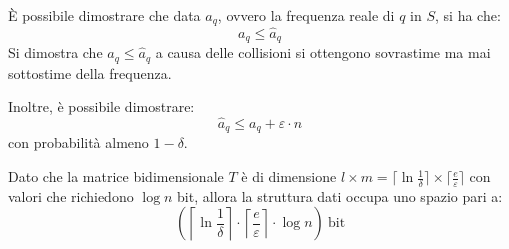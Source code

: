È possibile dimostrare che data $a_q$, ovvero la frequenza reale di $q$ in $S$,
si ha che:
\begin{equation}
    a_q \leq \hat{a}_q
\end{equation}
Si dimostra che $a_q \leq \hat{a}_q$ a causa delle collisioni si ottengono
sovrastime ma mai sottostime della frequenza.

Inoltre, è possibile dimostrare:
\begin{equation}
    \hat{a}_q \leq a_q + \varepsilon \cdot n
\end{equation}
con probabilità almeno $1 - \delta$.

Dato che la matrice bidimensionale $T$ è di dimensione $l \times m = \lceil \ln
    \frac{1}{\delta} \rceil \times \lceil \frac{e}{\varepsilon} \rceil$ con
valori che richiedono $\log n$ bit, allora la struttura dati occupa uno spazio
pari a:
\begin{equation}
    \left( \left\lceil \ln \frac{1}{\delta} \right\rceil \cdot \left\lceil
    \frac{e}{\varepsilon} \right\rceil \cdot \log n \right) \ \text{bit}
\end{equation}
